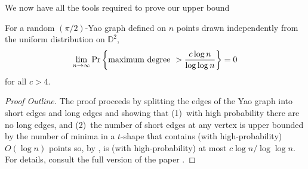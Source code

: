 \documentclass[10pt]{llncs}
\newcommand{\D}{\mathbb{D}}
\newcommand{\PROB}{\Pr}
\newcommand{\EXP}{\mathrm{E}}
\begin{document}
We now have all the tools required to prove our upper bound

\begin{thm}
For a random $(\pi/2)$-Yao graph defined on $n$ points drawn
independently from the uniform distribution on
$\D^2$, 
\[
\lim_{n\to\infty} \PROB \left\{ \hbox{\rm maximum degree}~> {c \log n \over
\log \log n} \right\} = 0
\]
for all $c > 4$.
\end{thm}

\begin{proof}[Proof Outline]
The proof proceeds by splitting the edges of the Yao graph into short edges
and long edges and showing that (1)~with high probability there are no
long edges, and (2)~the number of short edges at any vertex is
upper bounded by the number of minima in a $t$-shape that contains (with
high-probability) $O(\log n)$ points so, by ,
is (with
high-probability) at most $c\log n/\log\log n$.  For details, consult the
full version of the paper \cite{dgm09}.
%
%
%

\end{proof}
\end{document}
